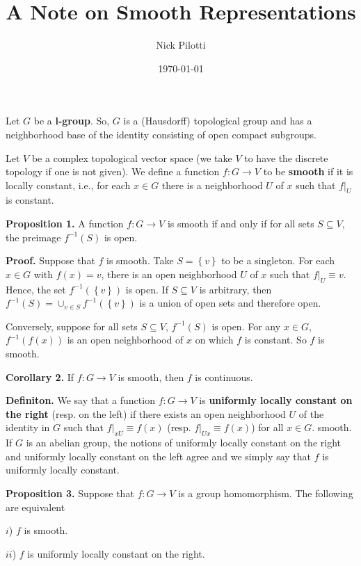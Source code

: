 \documentclass[12pt]{article}
\title{A Note on Smooth Representations}
\author{Nick Pilotti}
\date{\today}
\begin{document}
\maketitle

Let $G$ be a \textbf{l-group}. So, $G$ is a (Hausdorff) topological group and
has a neighborhood base of the identity consisting of open compact subgroups.

Let $V$ be a complex topological vector space (we take $V$ to have the discrete
topology if one is not given). We define a function $f : G \rightarrow V$ to be
\textbf{smooth} if it is locally constant, i.e., for each $x \in G$ there is a
neighborhood $U$ of $x$ such that $f|_{U}$ is constant.

\textbf{Proposition 1.} A function $f : G \rightarrow V$ is smooth if and only if
for all sets $S \subseteq V$, the preimage $f^{-1}\left(S\right)$ is open.

\textbf{Proof.} Suppose that $f$ is smooth. Take $S = \left\{v\right\}$ to be a
singleton. For each $x \in G$ with $f\left(x\right) = v$, there is an open
neighborhood $U$ of $x$ such that $f|_{U} \equiv v$. Hence, the set
$f^{-1}\left(\left\{v\right\}\right)$ is open. If $S \subseteq V$ is arbitrary,
then $f^{-1}\left(S\right) = \cup_{v \in S} f^{-1}\left(\left\{v\right\}\right)$
is a union of open sets and therefore open.

Conversely, suppose for all sets $S \subseteq V$, $f^{-1}\left(S\right)$ is
open. For any $x \in G$, $f^{-1}\left(f\left(x\right)\right)$ is an open
neighborhood of $x$ on which $f$ is constant. So $f$ is smooth.

\textbf{Corollary 2.} If $f : G \rightarrow V$ is smooth, then $f$ is continuous.

\textbf{Definiton.} We say that a function $f : G \rightarrow V$ is
\textbf{uniformly locally constant on the right} (resp. on the left) if there
exists an open neighborhood $U$ of the identity in $G$ such that $f|_{xU} \equiv
f\left(x\right)$ (resp. $f|_{Ux} \equiv f\left(x\right)$) for all $x \in G$.
smooth. If $G$ is an abelian group, the notions of uniformly locally constant on
the right and uniformly locally constant on the left agree and we simply say
that $f$ is uniformly locally constant.

\textbf{Proposition 3.} Suppose that $f : G \rightarrow V$ is a group
homomorphism. The following are equivalent

$i$) $f$ is smooth.

$ii$) $f$ is uniformly locally constant on the right.
\end{document}
